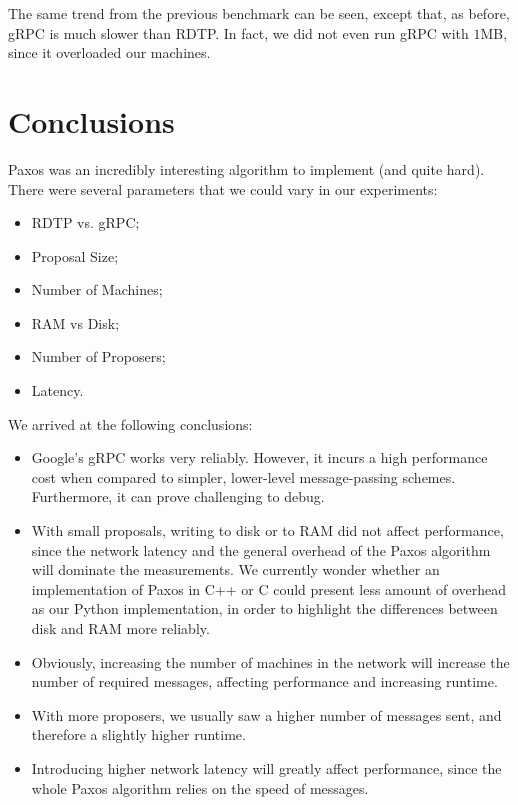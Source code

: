 \documentclass[12pt,]{article}
\providecommand{\tightlist}{%
  \setlength{\itemsep}{0pt}\setlength{\parskip}{0pt}}
\begin{document}
The same trend from the previous benchmark can be seen, except that,
as before, gRPC is much slower than RDTP. In fact, we did not even run
gRPC with $1$MB, since it overloaded our machines.

\section{Conclusions}\label{conclusions}

Paxos was an incredibly interesting algorithm to implement (and quite hard). There were several parameters that we could vary in our experiments:

\begin{itemize}
\tightlist
\item RDTP vs. gRPC;
\item Proposal Size;
\item Number of Machines;
\item RAM vs Disk;
\item Number of Proposers;
\item Latency.
\end{itemize}

We arrived at the following conclusions:

\begin{itemize}
\tightlist
\item Google's gRPC works very reliably. However, it incurs a high performance cost when compared to simpler, lower-level message-passing schemes. Furthermore, it can prove challenging to debug.
\item With small proposals, writing to disk or to RAM did not affect performance, since the network latency and the general overhead of the Paxos algorithm will dominate the measurements. We currently wonder whether an implementation of Paxos in C++ or C could present less  amount of overhead as our Python implementation, in order to highlight the differences between disk and RAM more reliably.
\item Obviously, increasing the number of machines in the network will increase the number of required messages, affecting performance and increasing runtime.
\item With more proposers, we usually saw a higher number of messages sent, and therefore a slightly higher runtime.
\item Introducing higher network latency will greatly affect performance, since the whole Paxos algorithm relies on the speed of messages.
\end{itemize}
\end{document}
